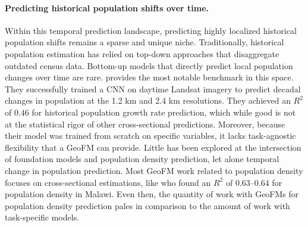 \documentclass[12pt,letterpaper]{article}
\begin{document}
\paragraph{Predicting historical population shifts over time.} Within this temporal prediction landscape, predicting highly localized historical population shifts remains a sparse and unique niche. Traditionally, historical population estimation has relied on top-down approaches that disaggregate outdated census data. Bottom-up models that directly predict local population changes over time are rare. \textcite{khachiyan2021using} provides the most notable benchmark in this space. They successfully trained a CNN on daytime Landsat imagery to predict decadal changes in population at the 1.2 km and 2.4 km resolutions. They achieved an $R^2$ of $0.46$ for historical population growth rate prediction, which while good is not at the statistical rigor of other cross-sectional predictions. Moreover, because their model was trained from scratch on specific variables, it lacks task-agnostic flexibility that a GeoFM can provide. Little has been explored at the intersection of foundation models and population density prediction, let alone temporal change in population prediction. Most GeoFM work related to population density focuses on cross-sectional estimations, like \textcite{metz2025application} who found an $R^2$ of $0.63$--$0.64$ for population density in Malawi. Even then, the quantity of work with GeoFMs for population density prediction pales in comparison to the amount of work with task-specific models.
\end{document}
